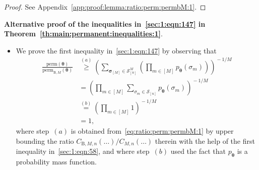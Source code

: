 \documentclass[journal,lettersize,twocolumn]{IEEEtran} %
\newcommand{\set}[1]{\mathcal{#1}}
\newcommand{\matr}[1]{ \bm{#1} }
\newcommand{\perm}{ \mathrm{perm} }
\newcommand{\permbM}[1]{\perm_{ \mathrm{B}, #1 }}
\newcommand{\pmtheta}{p_{\mtheta}}
\newcommand{\vsigma}{ \bm{\sigma} }
\newcommand{\setS}{\set{S}}
\newcommand{\CM}[1]{\Cgen{M}{#1}}
\newcommand{\Cgen}[2]{C_{#1,#2}}
\newcommand{\CBM}[1]{\CBgen{M}{#1}}
\newcommand{\CBgen}[2]{C_{\mathrm{B},#1,#2}}
\newcommand{\mtheta}{\matr{\theta}}
\begin{document}
%

\begin{proof}
  See Appendix~\ref{app:proof:lemma:ratio:perm:permbM:1}.
\end{proof}

%

\noindent
\textbf{Alternative proof of the inequalities in~\eqref{sec:1:eqn:147} in
  Theorem~\ref{th:main:permanent:inequalities:1}}.
\begin{itemize}

\item We prove the first inequality in~\eqref{sec:1:eqn:147} by observing that
  \begin{align*}
    \frac{\perm(\mtheta)}
         {\permbM{M}(\mtheta)}
      &\overset{(a)}{\geq}
         \left( \!
           \sum_{ \vsigma_{[M]} \in \setS_{[n]}^{M} }
             \left(
               \prod_{m \in [M]}
                 \pmtheta(\sigma_m)
             \right)
         \right)^{\!\!\! -1/M} \\
      &= \left( \!
           \prod_{m \in [M]}
             \sum_{\sigma_m \in \setS_{[n]}}
               \pmtheta(\sigma_m)
         \right)^{\!\!\! -1/M} \\
      &\overset{(b)}{=}
         \left( \!
           \prod_{m \in [M]}
             1
         \right)^{\!\!\! -1/M} \\
      &= 1,
  \end{align*}
  where step~$(a)$ is obtained from~\eqref{eq:ratio:perm:permbM:1} by upper
  bounding the ratio $\CBM{n}(\ldots) / \CM{n}(\ldots)$ therein with the help
  of the first inequality in~\eqref{sec:1:eqn:58}, and where step~$(b)$ used
  the fact that $\pmtheta$ is a probability mass function.


\end{itemize}
\end{document}
